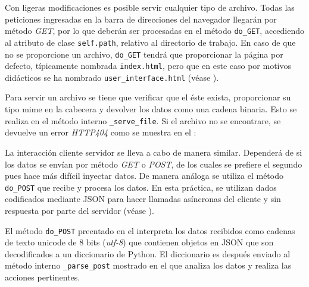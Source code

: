 Con ligeras modificaciones es posible servir cualquier tipo de archivo.
Todas las peticiones ingresadas en la barra de direcciones del navegador llegarán por método \emph{GET}, por lo que deberán ser procesadas en el método \texttt{do\_GET}, accediendo al atributo de clase \texttt{self.path}, relativo al directorio de trabajo.
En caso de que no se proporcione un archivo, \texttt{do\_GET} tendrá que proporcionar la página por defecto, típicamente nombrada \texttt{index.html}, pero que en este caso por motivos didácticos se ha nombrado \texttt{user\_interface.html} (véase ).



Para servir un archivo se tiene que verificar que el éste exista, proporcionar su tipo mime en la cabecera y devolver los datos como una cadena binaria.
Esto se realiza en el método interno \texttt{\_serve\_file}.
Si el archivo no se encontrare, se devuelve un error \emph{HTTP404} como se muestra en el :



La interacción cliente servidor se lleva a cabo de manera similar.
Dependerá de si los datos se envían por método \emph{GET} o \emph{POST}, de los cuales se prefiere el segundo pues hace más difícil inyectar datos.
De manera análoga se utiliza el método \texttt{do\_POST} que recibe y procesa los datos.
En esta práctica, se utilizan dados codificados mediante JSON para hacer llamadas asíncronas del cliente y sin respuesta por parte del servidor (véase ).



El método \texttt{do\_POST} preentado en el  interpreta los datos recibidos como cadenas de texto unicode de 8 bits (\emph{utf-8}) que contienen objetos en JSON que son decodificados a un diccionario de Python.
El diccionario es después enviado al método interno \texttt{\_parse\_post} mostrado en el  que analiza los datos y realiza las acciones pertinentes.



